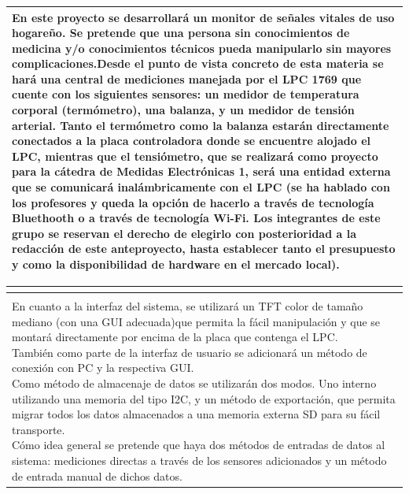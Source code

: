 \documentclass[5pt]{report}
\begin{document}
\begin{center}
\begin{adjustbox}{width=\textwidth}
\begin{tabular} {| c | c | c | c |}
		 		 \multicolumn {4}{|l|}{ \parbox{0.5\textwidth}{\scriptsize{En este proyecto se desarrollará un monitor de señales vitales de uso hogareño. Se pretende que una persona sin conocimientos de medicina y/o conocimientos técnicos pueda manipularlo sin mayores complicaciones.Desde el punto de vista concreto de esta materia se hará una central de mediciones manejada por el LPC 1769 que cuente con los siguientes sensores: un medidor de temperatura corporal (termómetro), una balanza, y un medidor de tensión arterial. Tanto el termómetro como la balanza estarán directamente conectados a la placa controladora donde se encuentre alojado el LPC, mientras que el tensiómetro, que se realizará como proyecto para la cátedra de Medidas Electrónicas 1, será una entidad externa que se comunicará inalámbricamente con el LPC (se ha hablado con los profesores y queda la opción de hacerlo a través de tecnología Bluethooth o a través de tecnología Wi-Fi. Los integrantes de este grupo se reservan el derecho de elegirlo con posterioridad a la redacción de este anteproyecto, hasta establecer tanto el presupuesto y como la disponibilidad de hardware en el mercado local).  }}}\\
 		 		\hline
 		 	\end{tabular}
	 	\end{adjustbox}
	 	\newpage
	 		\begin{adjustbox}{width=\textwidth}
	 			\centering
	 			\begin{tabular} {| c | c | c | c |}
	 				\multicolumn{4}{c}{  }\\
	 				\hline
	 				\multicolumn{4}{|c|}{  }\\
	 				\multicolumn {4}{|l|}{ \parbox{0.5\textwidth}{\scriptsize{En cuanto a la interfaz del sistema, se utilizará un TFT color de tamaño mediano (con una GUI adecuada)que permita la fácil manipulación y que se montará directamente por encima de la placa que contenga el LPC. \newline También como parte de la interfaz de usuario se adicionará un método de conexión con PC y la respectiva GUI. \newline Como método de almacenaje de datos se utilizarán dos modos. Uno interno utilizando una memoria del tipo I2C, y un método de exportación, que permita migrar todos los datos almacenados a una memoria externa SD para su fácil transporte. \newline Cómo idea general se pretende que haya dos métodos de entradas de datos al sistema: mediciones directas a través de los sensores adicionados y un método de entrada manual de dichos datos. } }}\\

\end{tabular}
\end{adjustbox}
\end{center}
\end{document}
